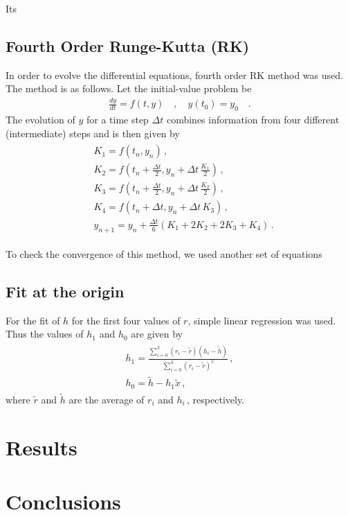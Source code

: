 \documentclass[11pt]{article}
\begin{document}
Its 

\subsection{Fourth Order Runge-Kutta (RK)}

In order to evolve the differential equations, fourth order RK method was used. The method is as follows. Let the initial-value problem be
\begin{gather}
    \frac{dy}{dt} = f(t,y)\quad, \quad y(t_0)=y_0 \quad .
\end{gather}
The evolution of $y$ for a time step $\Delta t$ combines information from four different (intermediate) steps and is then given by
\begin{gather}
    \begin{aligned}
        &K_1 = f(t_n, y_n)\, ,\\
        &K_2 = f(t_n + \frac{\Delta t}{2}, y_n + \Delta t\, \frac{K_1}{2})\,,\\
        &K_3 = f(t_n + \frac{\Delta t}{2}, y_n + \Delta t\, \frac{K_2}{2})\,,\\
        &K_4 = f(t_n + \Delta t, y_n + \Delta t\,K_3)\,,\\
        &y_{n+1} = y_n + \frac{\Delta t}{6}(K_1 + 2K_2 + 2K_3 + K_4)\,.
    \end{aligned}
\end{gather}

To check the convergence of this method, we used another set of equations

\subsection{Fit at the origin}

For the fit of $h$ for the first four values of $r$, simple linear regression was used. Thus the values of $h_1$ and $h_0$ are given by
\begin{gather}
    \begin{gathered}
        h_1 = \frac{\sum_{i=0}^{3}(r_i-\tilde{r})(h_i-\tilde{h})}{\sum_{i=0}^{3}(r_i-\tilde{r})^2}\,,\\
        h_0 = \tilde{h} - h_1\tilde{x}\,,
    \end{gathered}
\end{gather}
where $\tilde{r}$ and $\tilde{h}$ are the average of $r_i$ and $h_i\,$, respectively.



\section{Results}

\section{Conclusions}

\appendix





\end{document}
